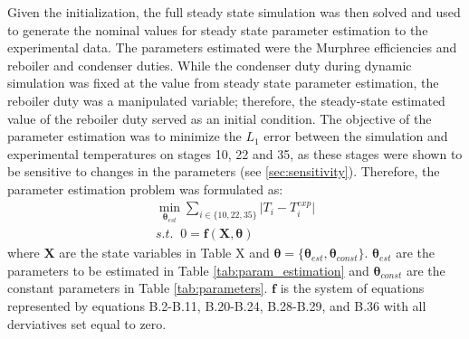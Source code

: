 Given the initialization, the full steady state simulation was then solved and used to generate the nominal values for steady state parameter estimation to the experimental data. The parameters estimated were the Murphree efficiencies and reboiler and condenser duties. While the condenser duty during dynamic simulation was fixed at the value from steady state parameter estimation, the reboiler duty was a manipulated variable; therefore, the steady-state estimated value of the reboiler duty served as an initial condition. The objective of the parameter estimation was to minimize the $L_1$ error between the simulation and experimental temperatures on stages 10, 22 and 35, as these stages were shown to be sensitive to changes in the parameters (see \ref{sec:sensitivity}). Therefore, the parameter estimation problem was formulated as:
\begin{subequations}
    \begin{align}
        \min_{\boldsymbol \theta_{est}} \sum_{i\in \{10, 22, 35\}} \mathopen|T_i-T_i^{exp}\mathclose|\\
        s.t. \;\; 0 = \mathbf f(\mathbf X, \boldsymbol \theta)
    \end{align}
\end{subequations}
where $\mathbf X$ are the state variables in Table X  and $\boldsymbol \theta = \{\boldsymbol \theta_{est}, \boldsymbol \theta_{const} \}$.  $\boldsymbol \theta_{est}$ are the parameters to be estimated in Table \ref{tab:param_estimation} and $\boldsymbol \theta_{const}$ are the constant parameters in Table \ref{tab:parameters}. $\mathbf f$ is the system of equations represented by equations B.2-B.11, B.20-B.24, B.28-B.29, and B.36 with all derviatives set equal to zero. 
